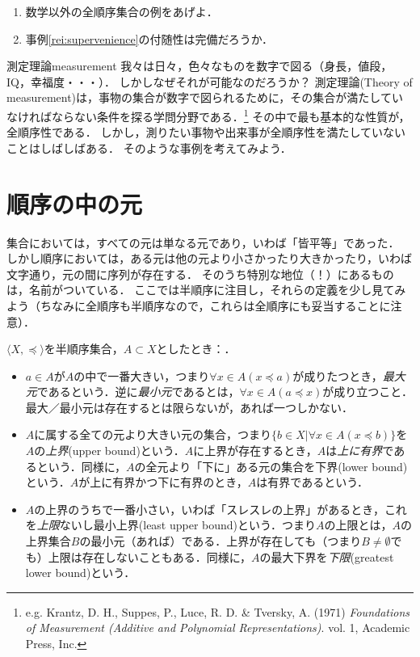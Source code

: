 \documentclass[dvipdfmx,11pt,a4paper]{jsarticle}
\begin{document}
\begin{renshu}{}{}
\begin{enumerate}
 \item 数学以外の全順序集合の例をあげよ．
 \item 事例\ref{rei:supervenience}の付随性は完備だろうか．
\end{enumerate}
\end{renshu}


\begin{rei}{測定理論}{measurement}
我々は日々，色々なものを数字で図る（身長，値段，IQ，幸福度・・・）．
しかしなぜそれが可能なのだろうか？
測定理論(Theory of measurement)は，事物の集合が数字で図られるために，その集合が満たしていなければならない条件を探る学問分野である．\footnote{e.g. Krantz, D. H., Suppes, P., Luce, R. D. \& Tversky, A. (1971) \textit{Foundations of Measurement (Additive and Polynomial Representations)}. vol. 1, Academic Press, Inc.}
その中で最も基本的な性質が，全順序性である．
しかし，測りたい事物や出来事が全順序性を満たしていないことはしばしばある．
そのような事例を考えてみよう．
\end{rei}



\section{順序の中の元}
集合においては，すべての元は単なる元であり，いわば「皆平等」であった．
しかし順序においては，ある元は他の元より小さかったり大きかったり，いわば文字通り，元の間に序列が存在する．
そのうち特別な地位（！）にあるものは，名前がついている．
ここでは半順序に注目し，それらの定義を少し見てみよう（ちなみに全順序も半順序なので，これらは全順序にも妥当することに注意）．

$\langle X, \preceq \rangle$を半順序集合，$A \subset X$としたとき：．
\begin{itemize}
  \item $a \in A$が$A$の中で一番大きい，つまり$\forall x \in A (x \preceq a)$が成りたつとき，\emph{最大元}であるという．逆に\emph{最小元}であるとは，$\forall x \in A (a \preceq x)$が成り立つこと．最大／最小元は存在するとは限らないが，あれば一つしかない．
  \item $A$に属する全ての元より大きい元の集合，つまり$\{ b \in X | \forall x \in A (x \preceq b) \}$を$A$の\emph{上界}(upper bound)という．$A$に上界が存在するとき，$A$は\emph{上に有界}であるという．同様に，$A$の全元より「下に」ある元の集合を下界(lower bound)という．$A$が上に有界かつ下に有界のとき，$A$は有界であるという．
  \item $A$の上界のうちで一番小さい，いわば「スレスレの上界」があるとき，これを\emph{上限}ないし最小上界(least upper bound)という．つまり$A$の上限とは，$A$の上界集合$B$の最小元（あれば）である．上界が存在しても（つまり$B \neq \emptyset$でも）上限は存在しないこともある．同様に，$A$の最大下界を\emph{下限}(greatest lower bound)という．
\end{itemize}
\end{document}
